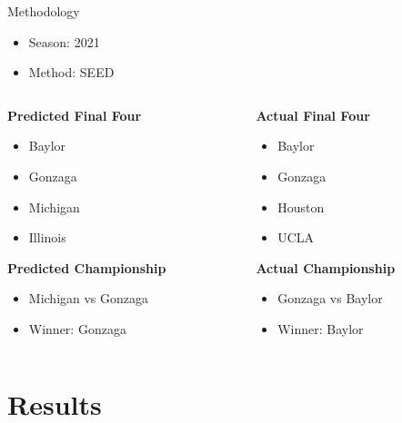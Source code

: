 \documentclass{beamer}
\begin{document}
\begin{frame}{Methodology}
\begin{itemize}
  \item Season: 2021
  \item Method: SEED
\end{itemize}

\begin{columns}[T] %
\begin{column}{0.5\textwidth} %
  \textbf{Predicted Final Four}
  \begin{itemize}
    \item Baylor
    \item Gonzaga
    \item Michigan
    \item Illinois
  \end{itemize}
  \textbf{Predicted Championship}
  \begin{itemize}
    \item Michigan vs Gonzaga
    \item Winner: Gonzaga
    \end{itemize}
\end{column}
\begin{column}{0.5\textwidth} %
  \textbf{Actual Final Four}
  \begin{itemize}
    \item Baylor
    \item Gonzaga
    \item Houston
    \item UCLA
  \end{itemize}
  \textbf{Actual Championship}
  \begin{itemize}
    \item Gonzaga vs Baylor
    \item Winner: Baylor
    \end{itemize}
\end{column}
\end{columns}
\end{frame}

\section{Results}
\end{document}
